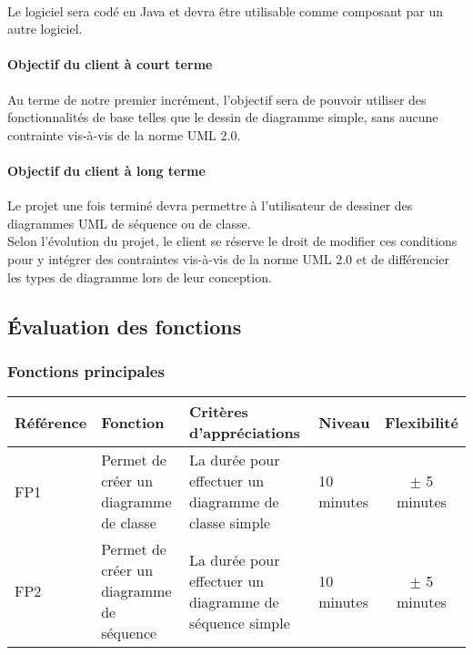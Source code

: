 \documentclass[12pt,a4paper,openany]{article}
\begin{document}
	\paragraph{}
		Le logiciel sera codé en Java et devra être utilisable comme composant par un autre logiciel.\\
	\paragraph{Objectif du client à court terme} Au terme de notre premier incrément, l'objectif sera
	de pouvoir utiliser des fonctionnalités de base telles que le dessin de diagramme simple, sans aucune
	contrainte vis-à-vis de la norme UML 2.0.
	\paragraph{Objectif du client à long terme}
	Le projet une fois terminé devra permettre à l'utilisateur de dessiner des diagrammes UML de séquence ou de classe.\\
	Selon l'évolution du projet, le client se réserve le droit de modifier ces conditions pour y
	intégrer des contraintes vis-à-vis de la norme UML 2.0 et de différencier les types de diagramme lors de leur conception. 
	
	\subsection{Évaluation des fonctions}
	\subsubsection{Fonctions principales}
	\begin{tabular}{|p{2cm}|p{3cm}|p{5cm}|p{3cm}|c|}
		\hline
		\textbf{Référence}& \textbf{Fonction} & \textbf{Critères d'appréciations} & \textbf{Niveau} & \textbf{Flexibilité} \\
		\hline
			FP1 & Permet de créer un diagramme de classe & La durée pour effectuer un diagramme de classe simple & 10 minutes & $\pm$ 5 minutes\\
		\hline
			FP2 & Permet de créer un diagramme de séquence & La durée pour effectuer un diagramme de séquence simple & 10 minutes & $\pm$ 5 minutes\\
		\hline
	\end{tabular}
\end{document}
